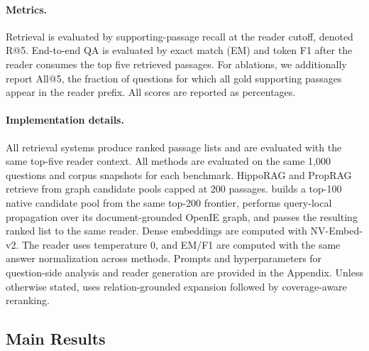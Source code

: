 \paragraph{Metrics.}
Retrieval is evaluated by supporting-passage recall at the reader cutoff,
denoted R@5. End-to-end QA is evaluated by exact match (EM) and token F1
after the reader consumes the top five retrieved passages. For ablations,
we additionally report All@5, the fraction of questions for which all
gold supporting passages appear in the reader prefix. All scores are
reported as percentages.

\paragraph{Implementation details.}
All retrieval systems produce ranked passage lists and are evaluated with
the same top-five reader context. All methods are evaluated on the same
1,000 questions and corpus snapshots for each benchmark. HippoRAG and
PropRAG retrieve from graph candidate pools capped at 200 passages.
\methodname{} builds a top-100 native candidate pool from the same
top-200 frontier, performs query-local propagation over its
document-grounded OpenIE graph, and passes the resulting ranked list to
the same reader. Dense embeddings are computed with NV-Embed-v2. The
reader uses temperature 0, and EM/F1 are computed with the same answer
normalization across methods. Prompts and hyperparameters for
question-side analysis and reader generation are provided in the
Appendix. Unless otherwise stated, \methodname{} uses relation-grounded
expansion followed by coverage-aware reranking.

\subsection{Main Results}
\label{sec:experiments:main}

